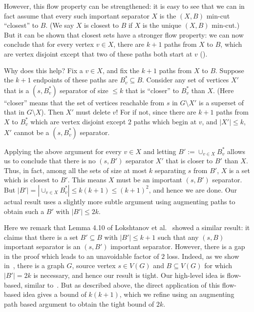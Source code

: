 \documentclass[11pt]{article}
\begin{document}
However, this flow property can be strengthened: it is easy to see that we can in fact assume that every such important separator $X$ is the $(X,B)$ min-cut ``closest'' to $B$. (We say $X$ is closest to $B$ if $X$ is the unique $(X, B)$ min-cut.)
But it can be shown that closest sets have a stronger flow property: we can now conclude that for every vertex $v \in X$, there are $k + 1$ paths from $X$ to $B$, which are vertex disjoint except that two of these paths both start at $v$ (). 

Why does this help? Fix a $v \in X$, and fix the $k + 1$ paths from $X$ to $B$. Suppose the $k + 1$ endpoints of these paths are $B^*_v \subseteq B$. Consider any set of vertices $X'$ that is a $(s,B^*_v)$ separator of size $\leq k$ that is ``closer'' to $B^*_v$ than $X$. (Here ``closer'' means that the set of vertices reachable from $s$ in $G \setminus X'$ is a superset of that in $G \setminus X$). Then $X'$ must delete $v$! For if not, since there are $k + 1$ paths from $X$ to $B^*_v$ which are vertex disjoint except $2$ paths which begin at $v$, and $|X'| \leq k$, $X'$ cannot be a $(s,B^*_v)$ separator. 

Applying the above argument for every $v \in X$ and letting $B' := \cup_{v \in X} B^*_v$ allows us to conclude that there is no $(s, B')$ separator $X'$ that is closer to $B'$ than $X$.
Thus, in fact, among all the sets of size at most $k$ separating $s$ from $B'$, $X$ is a set which is closest to $B'$. This means $X$ must be an important $(s,B')$ separator. But $|B'| = |\cup_{v \in X} B^*_v| \leq k(k + 1) \leq (k +1)^2$, and hence we are done. Our actual result uses a slightly more subtle argument using augmenting paths to obtain such a $B'$ with $|B'| \leq 2k$.


Here we remark that Lemma 4.10 of Lokshtanov et al.~\cite{lokshtanov2025wannabe} showed a similar result: it claims that there is a set $B' \subseteq B$ with $|B'| \leq k + 1$ such that any $(s,B)$ important separator is an $(s,B')$ important separator. However, there is a gap in the proof which leads to an unavoidable factor of $2$ loss. Indeed, as we show in~, there is a graph $G$, source vertex $s \in V(G)$ and $B \subseteq V(G)$ for which $|B'| = 2k$ is necessary, and hence our result is tight. Our high-level idea is flow-based, similar to~\cite{lokshtanov2025wannabe}. But as described above, the direct application of this flow-based idea gives a bound of $k(k + 1)$, which we refine using an augmenting path based argument to obtain the tight bound of $2k$.
\end{document}
